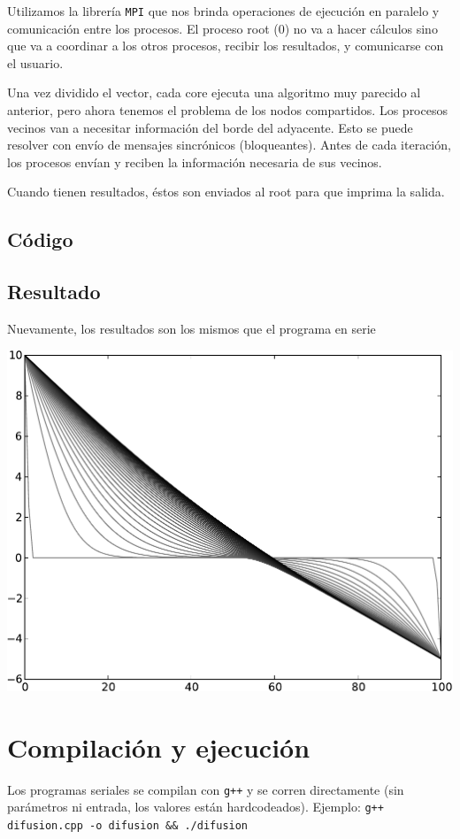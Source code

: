 \documentclass[12pt, a4paper]{article}
\begin{document}
			Utilizamos la librería \texttt{MPI} que nos brinda operaciones de ejecución en paralelo y comunicación entre los procesos.
			El proceso root (0) no va a hacer cálculos sino que va a coordinar a los otros procesos, recibir los resultados, y comunicarse con el usuario.
			
			Una vez dividido el vector, cada core ejecuta una algoritmo muy parecido al anterior, pero ahora tenemos el problema de los nodos compartidos.
			Los procesos vecinos van a necesitar información del borde del adyacente.
			Esto se puede resolver con envío de mensajes sincrónicos (bloqueantes).
			Antes de cada iteración, los procesos envían y reciben la información necesaria de sus vecinos.
			
			Cuando tienen resultados, éstos son enviados al root para que imprima la salida.
			
			\subsection{Código}
				
			
			\subsection{Resultado}
				Nuevamente, los resultados son los mismos que el programa en serie
				\begin{center}\includegraphics[width=.9\textwidth]{alpha0.pdf}\end{center}
		
		\section{Compilación y ejecución}
			Los programas seriales se compilan con \texttt{g++} y se corren directamente (sin parámetros ni entrada, los valores están hardcodeados).
			Ejemplo: \texttt{g++ difusion.cpp -o difusion \&\& ./difusion}
			
\end{document}

